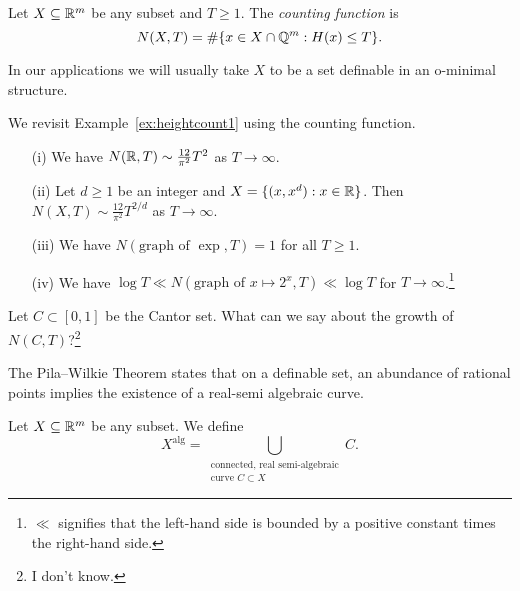 \begin{definition}
  \label{def:countingfunc}
  Let $X\subseteq{\mathbb{R}}^m$ be any subset and $T\ge 1$. The \emph{counting
    function} is 
  \begin{equation*}
    N(X,T) = \#\{ x\in X\cap {\mathbb{Q}}^m : H(x)\le T\}. 
  \end{equation*}
\end{definition}

In our applications we will usually take $X$ to be a  set definable in
an o-minimal structure.

\begin{example}
  \label{ex:heightcount2}
  We revisit Example~\ref{ex:heightcount1} using the counting
  function.
  \begin{enumerate}
  \item [(i)] We have $N({\mathbb{R}},T)\sim \frac{12}{\pi^2}T^2$ as
    $T\rightarrow\infty$.
  \item [(ii)] Let $d\ge 1$ be an integer and $X= \{(x,x^d):
    x\in{\mathbb{R}}\}$. Then $N(X,T)\sim \frac{12}{\pi^2}T^{2/d}$ as
    $T\rightarrow\infty$.
  \item[(iii)] We have $N(\text{graph of }\exp,T) = 1$ for all $T\ge
    1$.
  \item [(iv)] We have $\log T \ll
    N(\text{graph of }x\mapsto 2^x,T)\ll \log T$ for $T\rightarrow\infty$.\footnote{$\ll$
      signifies that the left-hand side is bounded by a positive
      constant times the right-hand side.}
  \end{enumerate}
\end{example}

\begin{exercise}
  Let $C\subset [0,1]$ be the Cantor set. What can we say about the
  growth of $N(C,T)$?\footnote{I don't know.}
\end{exercise}

The Pila--Wilkie Theorem states that on a definable set, an abundance of
rational points implies the existence of a real-semi algebraic curve.

\begin{definition}
  Let $X\subseteq{\mathbb{R}}^m$ be any subset. We define
  \begin{equation*}
    X^{\mathrm{alg}} = \bigcup_{\substack{\text{connected, real
          semi-algebraic}\\ \text{curve }C\subset X}} C.
  \end{equation*}
\end{definition}

